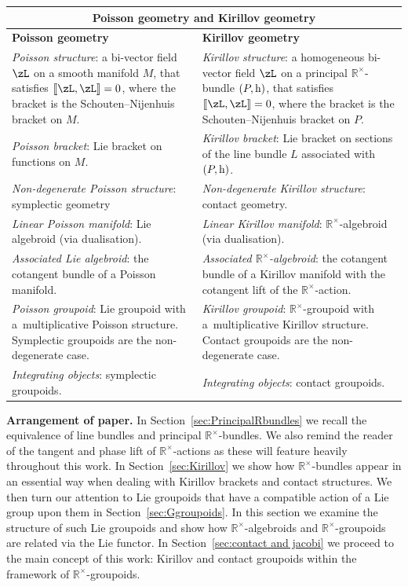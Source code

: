 \documentclass[10pt,a4paper]{amsart}
\newcommand{\Dleft}{[\hspace{-1.5pt}[}
\newcommand{\Dright}{]\hspace{-1.5pt}]}
\newcommand{\SN}[1]{\Dleft #1 \Dright}
\newcommand{\rmh}{\textnormal{h}}
\newcommand{\R}{{\mathbb R}}
\newcommand{\ti}{\times}
\def\Rt{{\R^\times}}
\numberwithin{equation}{section}
\begin{document}
\begin{table}[h!]\centering\renewcommand{\arraystretch}{1.25}
\begin{tabular}{ |p{7cm}||p{7cm}| }
 \hline
 \multicolumn{2}{|c|}{Poisson geometry and Kirillov geometry} \\
 \hline
 \textbf{Poisson geometry} & \textbf{Kirillov geometry} \\
 \hline
\emph{Poisson structure}: a bi-vector f\/ield $\zL$ on a smooth manifold $M$, that satisf\/ies $\SN{\zL, \zL} =0$, where the bracket is the Schouten--Nijenhuis bracket on $M$. & \emph{Kirillov structure}: a homogeneous bi-vec\-tor f\/ield $\zL$ on a principal $\R^\ti$-bundle $(P, \rmh)$, that satisf\/ies $\SN{\zL, \zL} =0$, where the bracket is the Schouten--Nijenhuis bracket on $P$.\\
\hline
\emph{Poisson bracket}: Lie bracket on functions on $M$. & \emph{Kirillov bracket}: Lie bracket on sections of the line bundle $L$ associated with $(P, \rmh)$. \\
\hline
\emph{Non-degenerate Poisson structure}: symplectic geometry & \emph{Non-degenerate Kirillov structure}: contact geometry.\\
\hline
\emph{Linear Poisson manifold}: Lie algebroid (via dualisation). & \emph{Linear Kirillov manifold}: $\R^\ti$-algebroid (via dualisation).\\
\hline
\emph{Associated Lie algebroid}: the cotangent bundle of a Poisson manifold. & \emph{Associated $\R^\ti$-algebroid}: the cotangent bundle of a Kirillov manifold with the cotangent lift of the $\R^\ti$-action.\\
\hline
\emph{Poisson groupoid}: Lie groupoid with a~mul\-ti\-plicative Poisson structure. Symp\-lec\-tic groupoids are the non-degenerate case. & \emph{Kirillov groupoid}: $\R^\ti$-groupoid with a~mul\-tiplicative Kirillov structure. Contact groupoids are the non-degenerate case.\\
\hline
\emph{Integrating objects}: symplectic groupoids. & \emph{Integrating objects}: contact groupoids.\\
\hline
\end{tabular}
\end{table}


\textbf{Arrangement of paper.} In Section~\ref{sec:PrincipalRbundles} we recall the equivalence of line bundles and principal $\mathbb{R}^{\times}$-bundles. We also remind the reader of the tangent and phase lift of $\mathbb{R}^{\times}$-actions as these will feature heavily throughout this work. In Section~\ref{sec:Kirillov} we show how $\mathbb{R}^{\times}$-bundles appear in an essential way when dealing with Kirillov brackets and contact structures. We then turn our attention to Lie groupoids that have a compatible action of a Lie group upon them in Section~\ref{sec:Ggroupoids}. In this section we examine the structure of such Lie groupoids and show how $\Rt$-algebroids and $\mathbb{R}^{\times}$-groupoids are related via the Lie functor. In Section~\ref{sec:contact and jacobi} we proceed to the main concept of this work: Kirillov and contact groupoids within the framework of $\mathbb{R}^{\times}$-groupoids.
\end{document}
